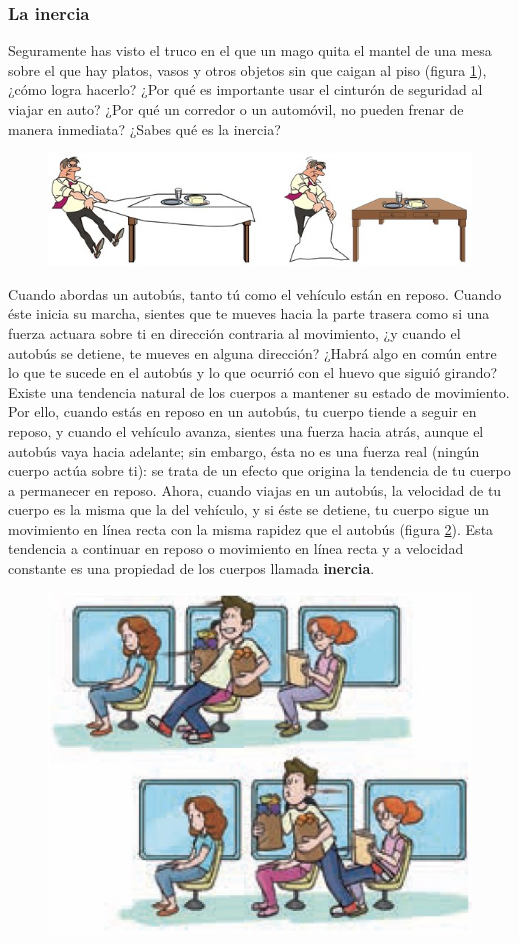 \documentclass[11pt]{book}
\begin{document}
\subsubsection{La inercia}
Seguramente has visto el truco en el que un mago quita el mantel de una mesa sobre
el que hay platos, vasos y otros objetos sin que caigan al piso
(figura \ref{fig:inercia}), ¿cómo logra hacerlo? ¿Por qué es importante
usar el cinturón de seguridad al viajar en auto?
¿Por qué un corredor o un automóvil, no pueden frenar de manera inmediata?
¿Sabes qué es la inercia?
\begin{figure}[H]
  \centering
  \includegraphics[width=0.6\linewidth]{inercia.jpg}
  \label{fig:inercia}
\end{figure}
Cuando abordas un autobús, tanto tú como el vehículo están en reposo. Cuando éste inicia su marcha,
sientes que te mueves hacia la parte trasera como si una fuerza actuara sobre ti en dirección
contraria al movimiento, ¿y cuando el autobús se detiene, te mueves en alguna dirección?
¿Habrá algo en común entre lo que te sucede en el autobús y lo que ocurrió con el huevo que
siguió girando? Existe una tendencia natural de los cuerpos a mantener su estado de movimiento.
Por ello, cuando estás en reposo en un autobús, tu cuerpo tiende a seguir en reposo, y cuando
el vehículo avanza, sientes una fuerza hacia atrás, aunque el autobús vaya hacia adelante;
sin embargo, ésta no es una fuerza real (ningún cuerpo actúa sobre ti): se trata de un efecto
que origina la tendencia de tu cuerpo a permanecer en reposo. Ahora, cuando viajas en un autobús,
la velocidad de tu cuerpo es la misma que la del vehículo, y si éste se detiene, tu cuerpo
sigue un movimiento en línea recta con la misma rapidez que el autobús (figura \ref{fig:autobus}).
Esta tendencia a continuar en reposo o movimiento en línea recta y
a velocidad constante es una propiedad de los cuerpos llamada \textbf{inercia}.

\begin{figure}[H]
  \centering
  \includegraphics[width=0.4\linewidth]{autobus.jpg}
  \label{fig:autobus}
\end{figure}
\end{document}
